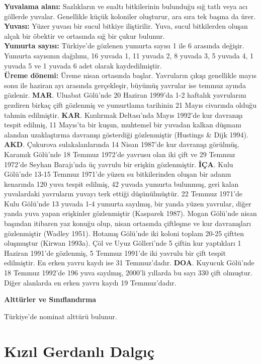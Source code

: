 \documentclass[
  letterpaper,
  DIV=11,
  numbers=noendperiod]{scrreprt}
\begin{document}
\textbf{Yuvalama alanı:} Sazlıkların ve sualtı bitkilerinin bulunduğu
sığ tatlı veya acı göllerde yuvalar. Genellikle küçük koloniler
oluşturur, ara sıra tek başına da ürer.\\
\textbf{Yuvası:} Yüzer yuvası bir sucul bitkiye iliştirilir. Yuva, sucul
bitkilerden oluşan alçak bir öbektir ve ortasında sığ bir çukur
bulunur.\\
\textbf{Yumurta sayısı:} Türkiye'de gözlenen yumurta sayısı 1 ile 6
arasında değişir. Yumurta sayısının dağılımı, 16 yuvada 1, 11 yuvada 2,
8 yuvada 3, 5 yuvada 4, 1 yuvada 5 ve 1 yuvada 6 adet olarak
kaydedilmiştir.\\
\textbf{Üreme dönemi:} Üreme nisan ortasında başlar. Yavruların çıkışı
genellikle mayıs sonu ile haziran ayı arasında gerçekleşir, büyümüş
yavrular ise temmuz ayında gözlenir. \textbf{MAR}. Uluabat Gölü'nde 20
Haziran 1999'da 1-2 haftalık yavrularını gezdiren birkaç çift gözlenmiş
ve yumurtlama tarihinin 21 Mayıs civarında olduğu tahmin edilmiştir.
\textbf{KAR}. Kızılırmak Deltası'nda Mayıs 1992'de kur davranışı tespit
edilmiş, 11 Mayıs'ta bir kuşun, muhtemel bir yuvadan kalkan düşmanı
alandan uzaklaştırma davranışı gösterdiği gözlenmiştir (Hustings \& Dijk
1994). \textbf{AKD}. Çukurova sulakalanlarında 14 Nisan 1987'de kur
davranışı görülmüş, Karamık Gölü'nde 18 Temmuz 1972'de yavrusu olan iki
çift ve 29 Temmuz 1972'de Seyhan Barajı'nda üç yavrulu bir erişkin
gözlenmiştir. \textbf{İÇA}. Kulu Gölü'nde 13-15 Temmuz 1971'de yüzen su
bitkilerinden oluşan bir adanın kenarında 120 yuva tespit edilmiş, 42
yuvada yumurta bulunmuş, geri kalan yuvalardaki yavruların yuvayı terk
ettiği düşünülmüştür. 22 Temmuz 1971'de Kulu Gölü'nde 13 yuvada 1-4
yumurta sayılmış, bir yanda yüzen yavrular, diğer yanda yuva yapan
erişkinler gözlenmiştir (Kasparek 1987). Mogan Gölü'nde nisan başından
itibaren yaz konuğu olup, nisan ortasında çiftleşme ve kur davranışları
gözlenmiştir (Wadley 1951). Hotamış Gölü'nde iki koloni toplam 20-25
çiftten oluşmuştur (Kirwan 1993a). Çöl ve Uyuz Gölleri'nde 5 çiftin kur
yaptıkları 1 Haziran 1991'de gözlenmiş, 5 Temmuz 1991'de iki yavrulu bir
çift tespit edilmiştir. En erken yavru kaydı ise 31 Temmuz'dadır.
\textbf{DOA}. Kuyucuk Gölü'nde 18 Temmuz 1992'de 196 yuva sayılmış,
2000'li yıllarda bu sayı 330 çift olmuştur. Diğer alanlarda en erken
yavru kaydı 19 Temmuz'dadır.

\textbf{Alttürler ve Sınıflandırma}

Türkiye'de nominat alttürü bulunur.

\section{Kızıl Gerdanlı
Dalgıç}\label{kux131zux131l-gerdanlux131-dalgux131uxe7}
\end{document}
